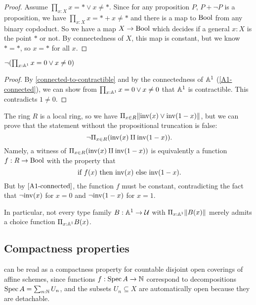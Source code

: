 \begin{proof}
  Assume $\prod_{x:X}x=* \vee x\neq *$.
  Since for any proposition $P$, $P + \neg P$ is a proposition,
  we have $\prod_{x:X}x=* + x\neq *$ and there is a map to $\mathrm{Bool}$ from any binary copdoduct.
  So we have a map $X\to \mathrm{Bool}$
  which decides if a general $x:X$ is the point $*$ or not.
  By connectedness of $X$, this map is constant, but we know $*=*$,
  so $x=*$ for all $x$.
\end{proof}

\begin{corollary}%
  \label{R-not-discrete}
  $\neg(\prod_{x:\mathbb{A}^1}x=0 \vee x\neq 0)$
\end{corollary}

\begin{proof}
  By \cref{connected-to-contractible} and by the connectedness of $\mathbb{A}^1$ (\cref{A1-connected}),
  we can show from $\prod_{x:\mathbb{A}^1}x=0 \vee x\neq 0$ that $\mathbb{A}^1$ is contractible.
  This contradicts $1\neq 0$.
\end{proof}

\begin{example}
  The ring $R$ is a local ring, so we have
  $\Pi_{x \in R} \lVert \mathrm{inv}(x) \lor \mathrm{inv}(1 - x) \rVert$,
  but we can prove that
  the statement without the propositional truncation is false:
  \[ \lnot \Pi_{x \in R} (\inv(x) \amalg \inv(1 - x)) \rlap{.} \]
  Namely,
  a witness of $\Pi_{x \in R} (\mathrm{inv}(x) \amalg \mathrm{inv}(1 - x))$
  is equivalently a function $f : R \to \mathrm{Bool}$
  with the property that
  \[ \text{if $f(x)$ then $\inv(x)$ else $\inv(1 - x)$} \rlap{.} \]
  But by $\cref{A1-connected}$,
  the function $f$ must be constant,
  contradicting the fact that
  $\lnot\mathrm{inv}(x)$ for $x = 0$ and $\lnot\mathrm{inv}(1 - x)$ for $x = 1$.

  In particular,
  not every type family $B : \mathbb{A}^1 \to \mathcal{U}$ with $\Pi_{x : \mathbb{A}^1} \lVert B(x) \rVert$
  merely admits a choice function $\Pi_{x : \mathbb{A}^1} B(x)$.
\end{example}

\subsection{Compactness properties}

 can be read as a compactness property
for countable disjoint open coverings of affine schemes,
since functions $f : \operatorname{Spec} A \to \mathbb{N}$
correspond to decompositions $\operatorname{Spec} A = \sum_{n : \mathbb{N}} U_n$,
and the subsets $U_n \subseteq X$ are automatically open
because they are detachable.

